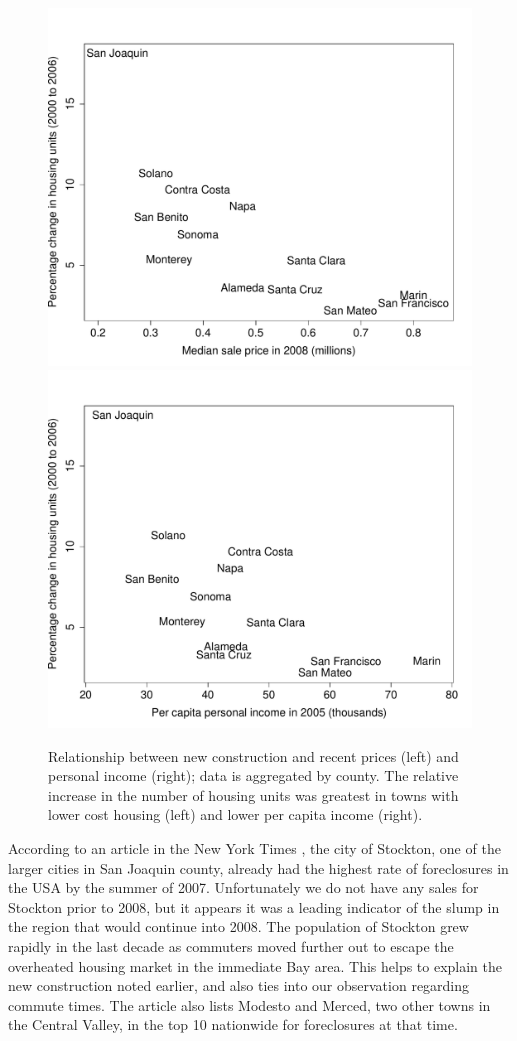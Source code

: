 \documentclass[oneside]{article}
\begin{document}
\begin{figure}[htbp]
  \centering
    \includegraphics[width=0.5\linewidth]{county_newconstruct}%
    \includegraphics[width=0.5\linewidth]{county_newconstruct2}
  \caption{Relationship between new construction and recent prices (left) and personal income (right); data is aggregated by county. The relative increase in the number of housing units was greatest in towns with lower cost housing (left) and lower per capita income (right).}
  \label{fig:newconstruct}
\end{figure}

According to an article in the New York Times \citep{mckinley:2007}, the city of Stockton, one of the larger cities in San Joaquin county, already had the highest rate of foreclosures in the USA by the summer of 2007. Unfortunately we do not have any sales for Stockton prior to 2008, but it appears it was a leading indicator of the slump in the region that would continue into 2008. The population of Stockton grew rapidly in the last decade as commuters moved further out to escape the overheated housing market in the immediate Bay area. This helps to explain the new construction noted earlier, and also ties into our observation regarding commute times. The article also lists Modesto and Merced, two other towns in the Central Valley, in the top 10 nationwide for foreclosures at that time.   

\end{document}
